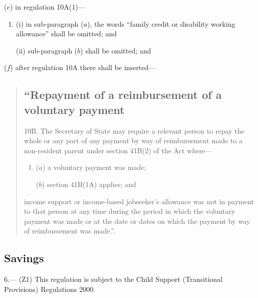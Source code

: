 \documentclass[12pt,a4paper]{article}
\begin{document}
\begin{enumerate}
($e$) in regulation 10A(1)—
\begin{enumerate}\item[]
(i) in sub-paragraph ($a$), the words “family credit or disability working allowance” shall be omitted; and

(ii) sub-paragraph ($b$)  shall be omitted; and
\end{enumerate}

($f$) after regulation 10A there shall be inserted—
\begin{quotation}
\subsection*{“Repayment of a reimbursement of a voluntary payment}

10B.  The Secretary of State may require a relevant person to repay the whole or any part of any payment by way of reimbursement made to a non-resident parent under section 41B(2) of the Act where—
\begin{enumerate}\item[]
($a$) a voluntary payment was made;

($b$) section 41B(1A) applies; and
\end{enumerate}
income support or income-based jobseeker’s allowance was not in payment to that person at any time during the period in which the voluntary payment was made or at the date or dates on which the payment by way of reimbursement was made.”.
\end{quotation}
\end{enumerate}


\subsection[6. Savings]{Savings}

6.---%
(Z1) This regulation is subject to the Child Support (Transitional Provisions) Regulations 2000.
\end{document}
